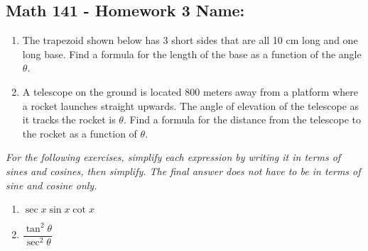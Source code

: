 \documentclass[11pt]{article}
\begin{document}
\pagestyle{empty}
\subsection*{Math 141 - Homework 3 \hfill Name: \underline{\hspace*{2in}}}

\begin{enumerate}
\item The trapezoid shown below has 3 short sides that are all 10 cm long and one long base.  Find a formula for the length of the base as a function of the angle $\theta$. 
\begin{flushright}
\end{flushright}

\item A telescope on the ground is located 800 meters away from a platform where a rocket launches straight upwards.  The angle of elevation of the telescope as it tracks the rocket is $\theta$.  Find a formula for the distance from the telescope to the rocket as a function of $\theta$. 
\begin{flushright}
\end{flushright}
\setcounter{enumCount}{\theenumi}
\end{enumerate}

\noindent
\textit{For the following exercises, simplify each expression by writing it in terms of sines and cosines, then simplify. The final answer does not have to be in terms of sine and cosine only.}
\begin{multicols}{2}
\begin{enumerate}
\setcounter{enumi}{\theenumCount}
\item $\sec x \sin x \cot x$
\item $\dfrac{\tan^2 \theta}{\sec^2 \theta}$
\setcounter{enumCount}{\theenumi}
\end{enumerate}
\end{multicols}
\vfill
\end{document}
